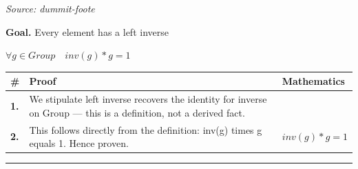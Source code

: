 \documentclass[11pt]{article}
\theoremstyle{definition}
\begin{document}
\smallskip\noindent\textit{Source: dummit-foote}\par
\medskip
\noindent\textbf{Goal.} Every element has a left inverse\par
\noindent$\displaystyle \forall g \in Group\quad inv(g) * g = 1$\par
\medskip
\noindent
\begin{tabular}{@{} >{\raggedright\arraybackslash}p{} >{\raggedright\arraybackslash}p{} >{\raggedleft\arraybackslash}p{} @{}}
\textbf{\#} & \textbf{Proof} & \textbf{Mathematics} \\
\midrule
\textbf{1.} & We stipulate left inverse recovers the identity for inverse on Group — this is a definition, not a derived fact. & \\[0.45em]
\textbf{2.} & This follows directly from the definition: inv(g) times g equals 1. Hence proven. & $\displaystyle inv(g) * g = 1$ \\[0.45em]
\bottomrule
\end{tabular}
\label{thm:Group-inverse-left_inverse_recovers_the_identity}
\par\medskip\hrule
\end{document}
